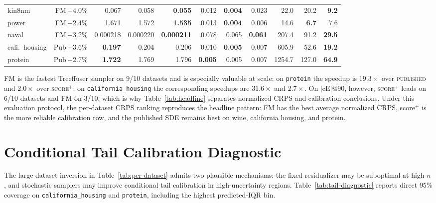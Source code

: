\documentclass{tpm2026}
\begin{document}
\begin{table}[!h]
\begin{tabular}{lrrrrrrrrrr}
    kin8nm             & FM\,$+$4.0\%      & 0.067 & 0.058 & \textbf{0.055} & 0.012 & \textbf{0.004} & 0.023 & 22.0 & 20.2 & \textbf{9.2} \\
    power              & FM\,$+$2.4\%      & 1.671 & 1.572 & \textbf{1.535} & 0.013 & \textbf{0.004} & 0.006 & 14.6 & \textbf{6.7} & 7.6 \\
    naval              & FM\,$+$3.2\%      & 0.000218 & 0.000220 & \textbf{0.000211} & 0.078 & 0.065 & \textbf{0.061} & 207.4 & 91.2 & \textbf{29.5} \\
    cali.\ housing     & Pub\,$+$3.6\%     & \textbf{0.197} & 0.204 & 0.206 & 0.010 & \textbf{0.005} & 0.007 & 605.9 & 52.6 & \textbf{19.2} \\
    protein            & Pub\,$+$2.7\%     & \textbf{1.722} & 1.769 & 1.796 & \textbf{0.005} & 0.005 & 0.007 & 1254.7 & 127.0 & \textbf{64.9} \\
    \bottomrule
  \end{tabular}
\end{table}

FM is the fastest Treeffuser sampler on 9/10 datasets and is especially valuable at scale: on \texttt{protein} the speedup is $19.3\times$ over \textsc{published} and $2.0\times$ over \textsc{score$^+$}; on \texttt{california\_housing} the corresponding speedups are $31.6\times$ and $2.7\times$. On $|\text{cE}|$@90, however, \textsc{score$^+$} leads on 6/10 datasets and FM on 3/10, which is why Table~\ref{tab:headline} separates normalized-CRPS and calibration conclusions. Under this evaluation protocol, the per-dataset CRPS ranking reproduces the headline pattern: FM has the best average normalized CRPS, score$^+$ is the more reliable calibration row, and the published SDE remains best on wine, california housing, and protein.

\section{Conditional Tail Calibration Diagnostic}\label{app:tail-diagnostic}

The large-dataset inversion in Table~\ref{tab:per-dataset} admits two plausible mechanisms: the fixed residualizer may be suboptimal at high $n$, and stochastic samplers may improve conditional tail calibration in high-uncertainty regions. Table~\ref{tab:tail-diagnostic} reports direct 95\% coverage on \texttt{california\_housing} and \texttt{protein}, including the highest predicted-IQR bin.
\end{document}
